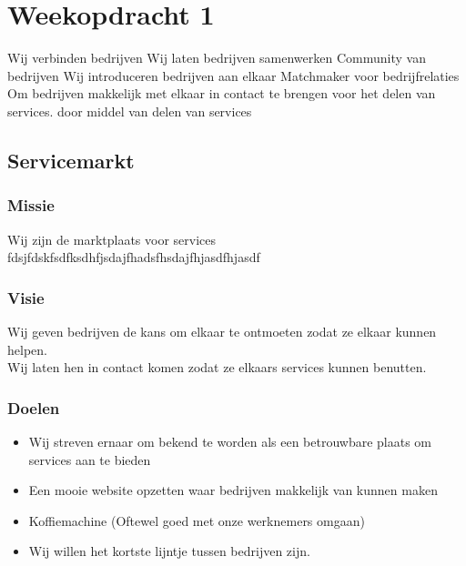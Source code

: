 \chapter{Weekopdracht 1}

Wij verbinden bedrijven
Wij laten bedrijven samenwerken
Community van bedrijven
Wij introduceren bedrijven aan elkaar
Matchmaker voor bedrijfrelaties
Om bedrijven makkelijk met elkaar in contact te brengen voor het delen van services.
door middel van delen van services

\section{Servicemarkt}

\subsection{Missie}
Wij zijn de marktplaats voor services
fdsjfdskfsdfksdhfjsdajfhadsfhsdajfhjasdfhjasdf

\subsection{Visie}
Wij geven bedrijven de kans om elkaar te ontmoeten zodat ze elkaar kunnen helpen. \\
Wij laten hen in contact komen zodat ze elkaars services kunnen benutten.

\subsection{Doelen}

\begin{itemize}
\item
  Wij streven ernaar om bekend te worden als
  een betrouwbare plaats om services aan te bieden
\item
  Een mooie website opzetten waar bedrijven makkelijk van kunnen maken
\item
  Koffiemachine (Oftewel goed met onze werknemers omgaan)
\item
  Wij willen het kortste lijntje tussen bedrijven zijn.
\end{itemize}
